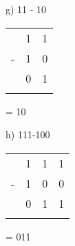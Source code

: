 \begin{figure}[H]
    \begin{minipage}[t]{0.45\textwidth}
        g) 11 - 10
        \begin{table}[H]
            \centering
            \begin{tabularx}{0.5\linewidth}{rXX}
                & 1 & 1\\
                - & 1 & 0\\
                \cline{2-3}
                & 0 & 1 \\
                \cline{2-3}
                &  &
            \end{tabularx}
        \end{table}
        = 10
    \end{minipage}\hfill
    \begin{minipage}[t]{0.45\textwidth}
        h) 111-100
        \begin{table}[H]
            \centering
            \begin{tabularx}{0.5\linewidth}{rXXX}
                & 1 & 1 & 1 \\
                - & 1 & 0 & 0\\
                \cline{2-4}
                & 0 & 1 & 1\\
                \cline{2-4}
                &  & & 
            \end{tabularx}
        \end{table}
        = 011
    \end{minipage}\hfill
\end{figure}

